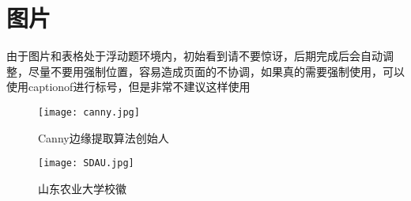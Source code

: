 \chapter{图片}


由于图片和表格处于浮动题环境内，初始看到请不要惊讶，后期完成后会自动调整，尽量不要用强制位置，容易造成页面的不协调，如果真的需要强制使用，可以使用captionof进行标号，但是非常不建议这样使用

\begin{figure}[!htbp]
	  \texttt{[image: canny.jpg]}
	  \centering
	  \caption{Canny边缘提取算法创始人}
	  \label{canny}
\end{figure}

\begin{figure}
	\texttt{[image: SDAU.jpg]}
	\centering
	\caption{山东农业大学校徽}
	\label{xiaohui}
\end{figure}

